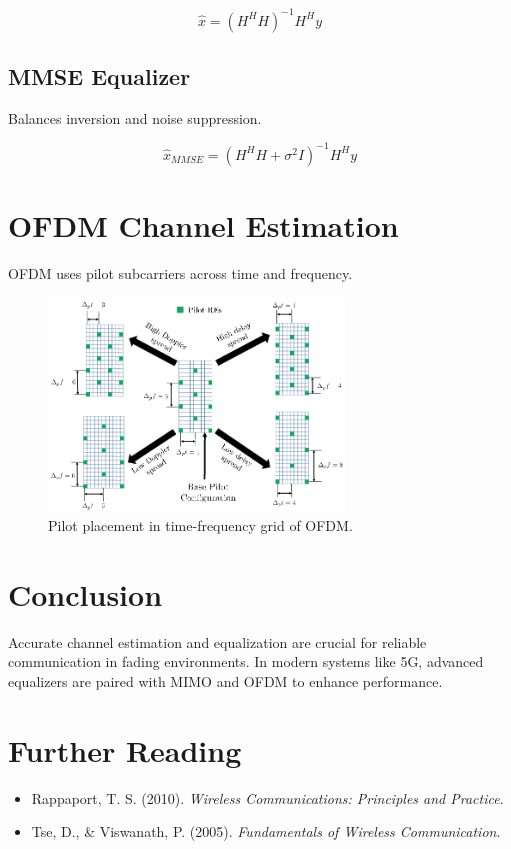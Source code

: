 \[
\hat{x} = (H^H H)^{-1} H^H y
\]

\subsection{MMSE Equalizer}
Balances inversion and noise suppression.

\[
\hat{x}_{MMSE} = (H^H H + \sigma^2 I)^{-1} H^H y
\]

\section{OFDM Channel Estimation}
OFDM uses pilot subcarriers across time and frequency.

\begin{figure}[H]
    \centering
    \includegraphics[width=0.7\textwidth]{images/ofdm_pilot_grid.png}
    \caption{Pilot placement in time-frequency grid of OFDM.}
\end{figure}

\section{Conclusion}
Accurate channel estimation and equalization are crucial for reliable communication in fading environments. In modern systems like 5G, advanced equalizers are paired with MIMO and OFDM to enhance performance.

\section*{Further Reading}
\begin{itemize}
  \item Rappaport, T. S. (2010). \textit{Wireless Communications: Principles and Practice}.
  \item Tse, D., \& Viswanath, P. (2005). \textit{Fundamentals of Wireless Communication}.
\end{itemize}

